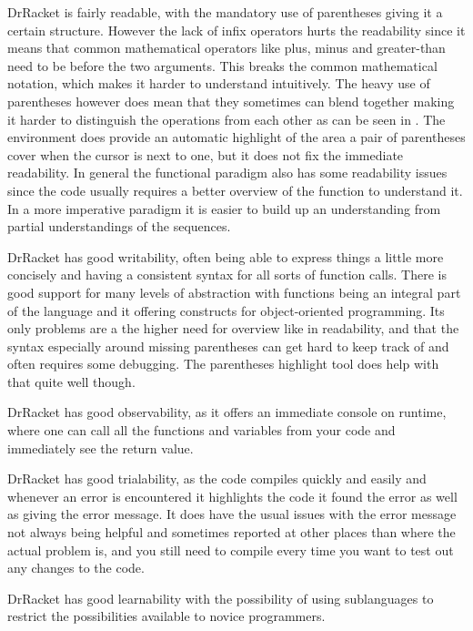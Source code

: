 \begin{description}[style=nextline]
\item[Readability] DrRacket is fairly readable, with the mandatory use of parentheses giving it a certain structure.
However the lack of infix operators hurts the readability since it means that common mathematical operators like plus, minus and greater-than need to be before the two arguments.
This breaks the common mathematical notation, which makes it harder to understand intuitively.
The heavy use of parentheses however does mean that they sometimes can blend together making it harder to distinguish the operations from each other as can be seen in .
The environment does provide an automatic highlight of the area a pair of parentheses cover when the cursor is next to one, but it does not fix the immediate readability.
In general the functional paradigm also has some readability issues since the code usually requires a better overview of the function to understand it.
In a more imperative paradigm it is easier to build up an understanding from partial understandings of the sequences.
\item[Writability] DrRacket has good writability, often being able to express things a little more concisely and having a consistent syntax for all sorts of function calls.
There is good support for many levels of abstraction with functions being an integral part of the language and it offering constructs for object-oriented programming.
Its only problems are a the higher need for overview like in readability, and that the syntax especially around missing parentheses can get hard to keep track of and often requires some debugging.
The parentheses highlight tool does help with that quite well though.
\item[Observability] DrRacket has good observability, as it offers an immediate console on runtime, where one can call all the functions and variables from your code and immediately see the return value.
\item[Trialability] DrRacket has good trialability, as the code compiles quickly and easily and whenever an error is encountered it highlights the code it found the error as well as giving the error message.
It does have the usual issues with the error message not always being helpful and sometimes reported at other places than where the actual problem is, and you still need to compile every time you want to test out any changes to the code.
\item[Learnability] DrRacket has good learnability with the possibility of using sublanguages to restrict the possibilities available to novice programmers.

\end{description}
